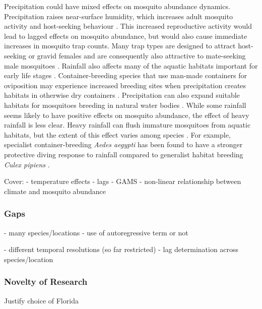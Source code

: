 Precipitation could have mixed effects on mosquito abundance dynamics. Precipitation raises near-surface humidity, which increases adult mosquito activity and host-seeking behaviour \citep{Shaman2007}. This increased reproductive activity would lead to lagged effects on mosquito abundance, but would also cause immediate increases in mosquito trap counts. Many trap types are designed to attract host-seeking or gravid females and are consequently also attractive to mate-seeking male mosquitoes \citep{Li2016}. Rainfall also affects many of the aquatic habitats important for early life stages \citep{Shaman2007}. Container-breeding species that use man-made containers for oviposition may experience increased breeding sites when precipitation creates habitats in otherwise dry containers \citep{Keith2005}. Precipitation can also expand suitable habitats for mosquitoes breeding in natural water bodies \citep{Koenraadt2008}. While some rainfall seems likely to have positive effects on mosquito abundance, the effect of heavy rainfall is less clear. Heavy rainfall can flush immature mosquitoes from aquatic habitats, but the extent of this effect varies among species \citep{Koenraadt2008, Paaijmans2007}. For example, specialist container-breeding \textit{Aedes aegypti} has been found to have a stronger protective diving response to rainfall compared to generalist habitat breeding \textit{Culex pipiens} \citep{Koenraadt2008}. %
	
Cover:
- temperature effects
- lags
- GAMS
- non-linear relationship between climate and mosquito abundance \citep{Roiz2014}

\subsubsection{Gaps}
- many species/locations
- use of autoregressive term or not

- different temporal resolutions (so far restricted)
- lag determination across species/location


\subsubsection{Novelty of Research}

Justify choice of Florida

